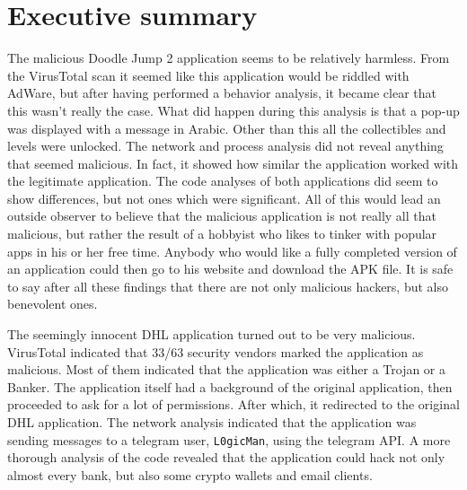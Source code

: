 \section*{Executive summary}

The malicious Doodle Jump 2 application seems to be relatively harmless.
From the VirusTotal scan it seemed like this application would be riddled with AdWare, but after having performed a behavior analysis, it became clear that this wasn’t really the case.
What did happen during this analysis is that a pop-up was displayed with a message in Arabic.
Other than this all the collectibles and levels were unlocked.
The network and process analysis did not reveal anything that seemed malicious.
In fact, it showed how similar the application worked with the legitimate application.
The code analyses of both applications did seem to show differences, but not ones which were significant.
All of this would lead an outside observer to believe that the malicious application is not really all that malicious, but rather the result of a hobbyist who likes to tinker with popular apps in his or her free time.
Anybody who would like a fully completed version of an application could then go to his website and download the APK file.
It is safe to say after all these findings that there are not only malicious hackers, but also benevolent ones.

The seemingly innocent DHL application turned out to be very malicious.
VirusTotal indicated that 33/63 security vendors marked the application as malicious.
Most of them indicated that the application was either a Trojan or a Banker.
The application itself had a background of the original application, then proceeded to ask for a lot of permissions.
After which, it redirected to the original DHL application.
The network analysis indicated that the application was sending messages to a telegram user, \texttt{L0gicMan}, using the telegram API.
A more thorough analysis of the code revealed that the application could hack not only almost every bank, but also some crypto wallets and email clients.
